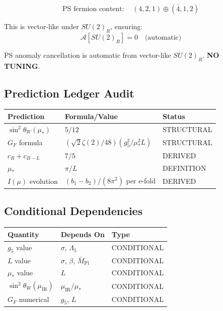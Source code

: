 \documentclass[11pt,a4paper]{article}
\begin{document}
\begin{equation}
\label{eq:anomaly-closure}
\text{PS fermion content}: \quad (4, 2, 1) \oplus (\bar{4}, 1, 2)
\end{equation}

This is vector-like under $SU(2)_R$, ensuring:
\begin{equation}
\label{eq:anomaly-vanish}
\mathcal{A}[SU(2)_R] = 0 \quad \text{(automatic)}
\end{equation}

\begin{trapbox}
\label{trap:rt11}
PS anomaly cancellation is automatic from vector-like $SU(2)_R$. \textbf{NO TUNING}.
\end{trapbox}

\subsection{Prediction Ledger Audit}
\label{subsec:prediction-ledger}

\begin{center}
\begin{tabular}{lll}
\toprule
\textbf{Prediction} & \textbf{Formula/Value} & \textbf{Status} \\
\midrule
$\sin^2\theta_W(\mu_*)$ & $5/12$ & STRUCTURAL \\
$G_F$ formula & $(\sqrt{2}\zeta(2)/48)(g_5^2/\mu_*^2 L)$ & STRUCTURAL \\
$c_R + c_{B-L}$ & $7/5$ & DERIVED \\
$\mu_*$ & $\pi/L$ & DEFINITION \\
$I(\mu)$ evolution & $(b_1-b_2)/(8\pi^2)$ per e-fold & DERIVED \\
\bottomrule
\end{tabular}
\end{center}

\subsection{Conditional Dependencies}
\label{subsec:conditionals}

\begin{center}
\begin{tabular}{lll}
\toprule
\textbf{Quantity} & \textbf{Depends On} & \textbf{Type} \\
\midrule
$g_5$ value & $\sigma$, $\Lambda_5$ & CONDITIONAL \\
$L$ value & $\sigma$, $\beta$, $\bar{M}_{\text{Pl}}$ & CONDITIONAL \\
$\mu_*$ value & $L$ & CONDITIONAL \\
$\sin^2\theta_W(\mu_{\text{IR}})$ & $\mu_{\text{IR}}/\mu_*$ & CONDITIONAL \\
$G_F$ numerical & $g_5$, $L$ & CONDITIONAL \\
\bottomrule
\end{tabular}
\end{center}
\end{document}
